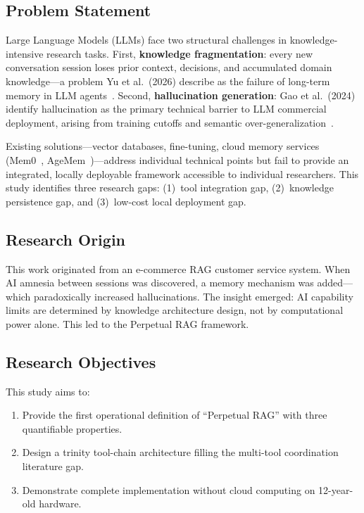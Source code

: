 \documentclass[conference]{IEEEtran}
\begin{document}
\subsection{Problem Statement}

Large Language Models (LLMs) face two structural challenges in
knowledge-intensive research tasks. First, \textbf{knowledge fragmentation}:
every new conversation session loses prior context, decisions, and accumulated
domain knowledge---a problem Yu et al.\ (2026) describe as the failure of
long-term memory in LLM agents~\cite{yu2026agemem}. Second,
\textbf{hallucination generation}: Gao et al.\ (2024) identify hallucination
as the primary technical barrier to LLM commercial deployment, arising from
training cutoffs and semantic over-generalization~\cite{gao2024rag}.

Existing solutions---vector databases, fine-tuning, cloud memory services
(Mem0~\cite{chhikara2025mem0}, AgeMem~\cite{yu2026agemem})---address
individual technical points but fail to provide an integrated, locally
deployable framework accessible to individual researchers. This study
identifies three research gaps: (1)~tool integration gap,
(2)~knowledge persistence gap, and (3)~low-cost local deployment gap.

\subsection{Research Origin}

This work originated from an e-commerce RAG customer service system. When AI
amnesia between sessions was discovered, a memory mechanism was added---which
paradoxically increased hallucinations. The insight emerged: AI capability
limits are determined by knowledge architecture design, not by computational
power alone. This led to the Perpetual RAG framework.

\subsection{Research Objectives}

This study aims to:
\begin{enumerate}
  \item Provide the first operational definition of ``Perpetual RAG'' with
        three quantifiable properties.
  \item Design a trinity tool-chain architecture filling the multi-tool
        coordination literature gap.
  \item Demonstrate complete implementation without cloud computing on
        12-year-old hardware.
\end{enumerate}
\end{document}
